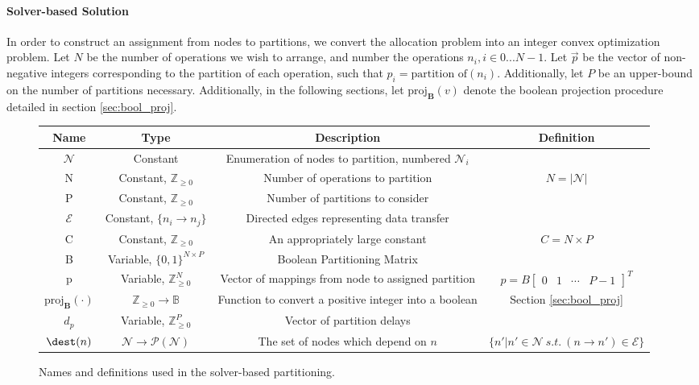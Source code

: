 \paragraph{Solver-based Solution}
\newcommand{\projb}[1]{\text{proj}_\mathbf{B}(#1)}
\newcommand{\nnint}{\mathbb{Z}_{\ge 0}}
\newcommand{\ind}[1]{\mathbb{1}[#1]}

In order to construct an assignment from nodes to partitions, 
we convert the allocation problem into an integer convex optimization problem. 
Let $N$ be the number of operations we wish to arrange, and number the operations $n_{i}, i \in {0 ... N-1}$. Let $\vec{p}$ be the vector of non-negative integers corresponding to the partition of each operation, such that $p_i = \text{partition of}(n_i)$. Additionally, let $P$ be an upper-bound on the number of partitions necessary. Additionally, in the following sections, let $\projb{v}$ denote the boolean projection procedure detailed in section \ref{sec:bool_proj}.

\begin{figure*}
	\begin{tabular}{c | c | c | c}
		Name & Type & Description & Definition\\\hline
		$\mathcal{N}$ & Constant & Enumeration of nodes to partition, numbered $\mathcal{N}_i$ & \\
		N & Constant, $\nnint$ & Number of operations to partition & $N = |\mathcal{N}|$\\
		P & Constant, $\nnint$ & Number of partitions to consider &\\
		$\mathcal{E}$ & Constant, $\{n_i \to n_j\}$& Directed edges representing data transfer & \\
		C & Constant, $\nnint$ & An appropriately large constant & $C = N \times P$\\
		B & Variable, $\{0, 1\}^{N \times P}$ & Boolean Partitioning Matrix&\\
    p & Variable, $\nnint^N$ & Vector of mappings from node to assigned partition& $p = B \begin{bmatrix} 0 & 1 & \cdots & P-1\end{bmatrix}^T$\\
		$\projb{\cdot}$ & $\nnint \to \mathbb{B}$ & Function to convert a positive integer into a boolean& Section \ref{sec:bool_proj}\\
		$d_p$ & Variable, $\nnint^P$ & Vector of partition delays & \\
		$\dest(n)$ & $\mathcal{N} \to \mathcal{P}(\mathcal{N})$& The set of nodes which depend on $n$& $\{n' | n' \in \mathcal{N}\ s.t.\ (n \to n') \in \mathcal{E}\}$
	\end{tabular}
	\caption{Names and definitions used in the solver-based partitioning.}
	\label{fig:solver-variables}
\end{figure*}

